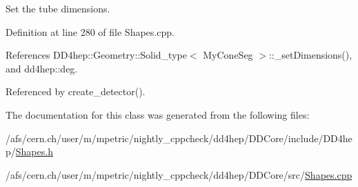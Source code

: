 Set the tube dimensions. 

Definition at line 280 of file Shapes.cpp.

References DD4hep::Geometry::Solid\_\-type$<$ MyConeSeg $>$::\_\-setDimensions(), and dd4hep::deg.

Referenced by create\_\-detector().

The documentation for this class was generated from the following files:\begin{DoxyCompactItemize}
\item 
/afs/cern.ch/user/m/mpetric/nightly\_\-cppcheck/dd4hep/DDCore/include/DD4hep/\hyperlink{_shapes_8h}{Shapes.h}\item 
/afs/cern.ch/user/m/mpetric/nightly\_\-cppcheck/dd4hep/DDCore/src/\hyperlink{_shapes_8cpp}{Shapes.cpp}\end{DoxyCompactItemize}
